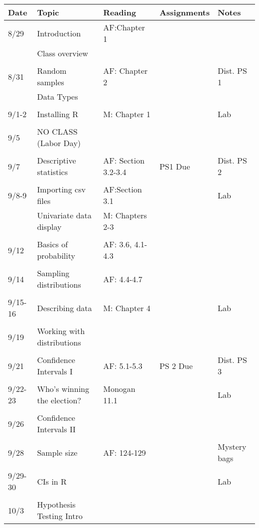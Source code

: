 \documentclass[11pt]{article}
\begin{document}
\begin{small}
\begin{center}
\begin{tabular}{p{1.5cm} p{4cm} p{3.5cm} p{3cm} p{4cm}}
  \toprule
  Date & Topic & Reading & Assignments & Notes  \\
  \midrule
 8/29 & Introduction & AF:Chapter 1  &  &  \\
  & Class overview & \\
  \\
 8/31 &  Random samples &  AF: Chapter 2& &  Dist. PS 1\\
  & Data Types & & &  \\ 
\\
  9/1-2 & Installing R   &  M: Chapter 1&  & Lab \\
\\
  9/5 & NO CLASS (Labor Day) \\
  \\
  9/7 & Descriptive statistics & AF: Section 3.2-3.4 & PS1 Due & Dist. PS 2\\
\\
  9/8-9 & Importing csv files &  AF:Section  3.1&  &  Lab\\
  & Univariate data display &  M: Chapters 2-3\\
  \\
  9/12 & Basics of probability &  AF: 3.6, 4.1-4.3 & & \\
  \\
  9/14 &  Sampling distributions &    AF: 4.4-4.7 & &\\
  \\
9/15-16 &  Describing data & M: Chapter 4&&  Lab\\
\\
9/19 & Working with distributions &  &   &\\
  \\
9/21 & Confidence Intervals I & AF: 5.1-5.3 & PS 2 Due&  Dist. PS 3\\
\\
9/22-23 & Who's winning the election? & Monogan 11.1 & & Lab \\
\\
 9/26 & Confidence Intervals II  &   & &  \\
\\
9/28 &Sample size &  AF: 124-129 && Mystery bags \\
\\
9/29-30 & CIs in R &  & & Lab \\
\\
10/3 & Hypothesis Testing Intro  & & &   \\

\end{tabular}
\end{center}
\end{small}
\end{document}
